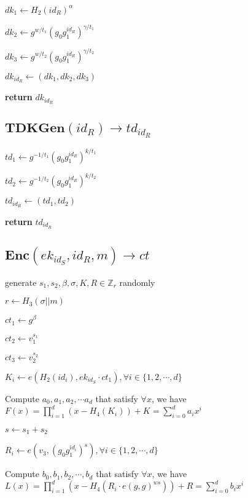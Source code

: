 \documentclass[a4paper]{article}
\begin{document}
$\textit{dk}_1 \gets H_2(\textit{id}_R)^\alpha$

$\textit{dk}_2 \gets g^{w / t_1} (g_0 g_1^{\textit{id}_R})^{\gamma / t_1}$

$\textit{dk}_3 \gets g^{w / t_2} (g_0 g_1^{\textit{id}_R})^{\gamma / t_2}$

$\textit{dk}_{\textit{id}_R} \gets (\textit{dk}_1, \textit{dk}_2, \textit{dk}_3)$

\textbf{return} $\textit{dk}_{\textit{id}_R}$

\subsection{$\textbf{TDKGen}(\textit{id}_R) \rightarrow \textit{td}_{\textit{id}_R}$}

$\textit{td}_1 \gets g^{-1 / t_1} (g_0 g_1^{\textit{id}_R})^{k / t_1}$

$\textit{td}_2 \gets g^{-1 / t_2} (g_0 g_1^{\textit{id}_R})^{k / t_2}$

$\textit{td}_{\textit{id}_R} \gets (\textit{td}_1, \textit{td}_2)$

\textbf{return} $\textit{td}_{\textit{id}_R}$

\subsection{$\textbf{Enc}(\textit{ek}_{\textit{id}_S}, \textit{id}_R, m) \rightarrow \textit{ct}$}

generate $s_1, s_2, \beta, \sigma, K, R \in \mathbb{Z}_r$ randomly

$r \gets H_3(\sigma || m)$

$\textit{ct}_1 \gets g^\beta$

$\textit{ct}_2 \gets v_1^{s_1}$

$\textit{ct}_3 \gets v_2^{s_2}$

$K_i \gets e(H_2(\textit{id}_i), ek_{\textit{id}_S} \cdot \textit{ct}_1), \forall i \in \{1, 2, \cdots, d\}$

Compute $a_0, a_1, a_2, \cdots a_d$ that satisfy $\forall x$, we have $F(x) = \prod\limits_{i = 1}^d (x - H_4(K_i)) + K = \sum\limits_{i = 0}^d a_i x^i$

$s \gets s_1 + s_2$

$R_i \gets e(v_3, (g_0 g_1^{\textit{id}_i})^s), \forall i \in \{1, 2, \cdots, d\}$

Compute $b_0, b_1, b_2, \cdots, b_d$ that satisfy $\forall x$, we have $L(x) = \prod\limits_{i = 1}^d (x - H_4(R_i \cdot e(g, g)^{ws})) + R = \sum\limits_{i = 0}^d b_i x^i$
\end{document}
